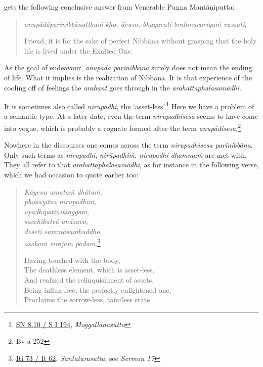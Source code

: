 gets the following conclusive answer from Venerable Puṇṇa Mantāṇiputta:

\begin{quote}
\emph{anupādāparinibbānatthaṁ kho, āvuso, bhagavati brahmacariyaṁ vussati},

Friend, it is for the sake of perfect Nibbāna without grasping that the holy life is lived under the Exalted One.
\end{quote}

As the goal of endeavour, \emph{anupādā parinibbāna} surely does not mean the ending of life. What it implies is the realization of Nibbāna. It is that experience of the cooling off of feelings the \emph{arahant} goes through in the \emph{arahattaphalasamādhi}.

It is sometimes also called \emph{nirupadhi}, the `asset-less'.\footnote{\href{https://suttacentral.net/sn8.10/pli/ms}{SN 8.10 / S I 194}, \emph{Moggallānasutta}} Here we have a problem of a semantic type. At a later date, even the term \emph{nirupadhisesa} seems to have come into vogue, which is probably a cognate formed after the term \emph{anupādisesa}.\footnote{Bv-a 252}

Nowhere in the discourses one comes across the term \emph{nirupadhisesa parinibbāna}. Only such terms as \emph{nirupadhi}, \emph{nirūpadhiṁ,} \emph{nirupadhi dhammaṁ} are met with. They all refer to that \emph{arahattaphalasamādhi}, as for instance in the following verse, which we had occasion to quote earlier too:

\enlargethispage{\baselineskip}

\begin{quote}
\emph{Kāyena amataṁ dhātuṁ,}\\
\emph{phusayitvā nirūpadhiṁ,}\\
\emph{upadhipaṭinissaggaṁ,}\\
\emph{sacchikatvā anāsavo,}\\
\emph{deseti sammāsambuddho,}\\
\emph{asokaṁ virajaṁ padaṁ.}\footnote{\href{https://suttacentral.net/iti73/pli/ms}{Iti 73 / It 62}, \emph{Santatarasutta}, see \emph{Sermon 17}}

Having touched with the body,\\
The deathless element, which is asset-less,\\
And realized the relinquishment of assets,\\
Being influx-free, the perfectly enlightened one,\\
Proclaims the sorrow-less, taintless state.
\end{quote}

